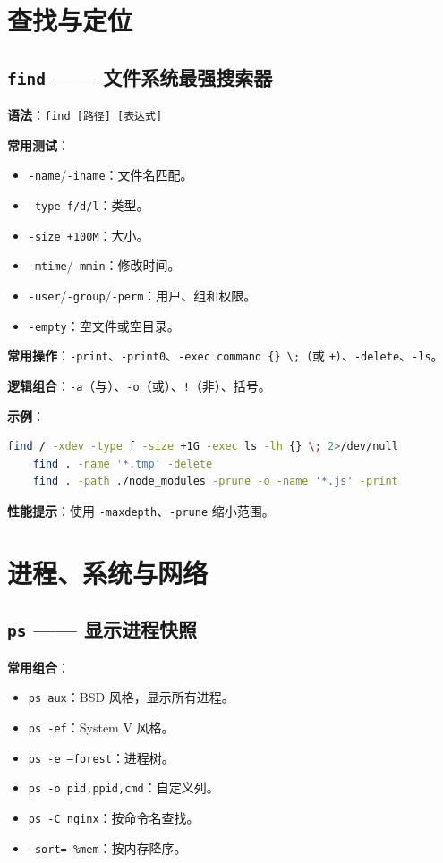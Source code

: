 \section{查找与定位}

\subsection{\texttt{find} —— 文件系统最强搜索器} \textbf{语法}：\texttt{find [路径] [表达式]}

\textbf{常用测试}：
\begin{itemize}
\item \texttt{-name}/\texttt{-iname}：文件名匹配。
\item \texttt{-type f/d/l}：类型。
\item \texttt{-size +100M}：大小。
\item \texttt{-mtime}/\texttt{-mmin}：修改时间。
\item \texttt{-user}/\texttt{-group}/\texttt{-perm}：用户、组和权限。
\item \texttt{-empty}：空文件或空目录。
\end{itemize}

\textbf{常用操作}：\texttt{-print}、\texttt{-print0}、\texttt{-exec command \{\} \textbackslash;}（或 \texttt{+}）、\texttt{-delete}、\texttt{-ls}。

\textbf{逻辑组合}：\texttt{-a}（与）、\texttt{-o}（或）、\texttt{!}（非）、括号。

\textbf{示例}：
\begin{lstlisting}[language=bash]
	find / -xdev -type f -size +1G -exec ls -lh {} \; 2>/dev/null
	find . -name '*.tmp' -delete
	find . -path ./node_modules -prune -o -name '*.js' -print
\end{lstlisting}

\textbf{性能提示}：使用 \texttt{-maxdepth}、\texttt{-prune} 缩小范围。

\section{进程、系统与网络}

\subsection{\texttt{ps} —— 显示进程快照} \textbf{常用组合}：
\begin{itemize}
\item \texttt{ps aux}：BSD 风格，显示所有进程。
\item \texttt{ps -ef}：System V 风格。
\item \texttt{ps -e --forest}：进程树。
\item \texttt{ps -o pid,ppid,cmd}：自定义列。
\item \texttt{ps -C nginx}：按命令名查找。
\item \texttt{--sort=-\%mem}：按内存降序。
\end{itemize}

